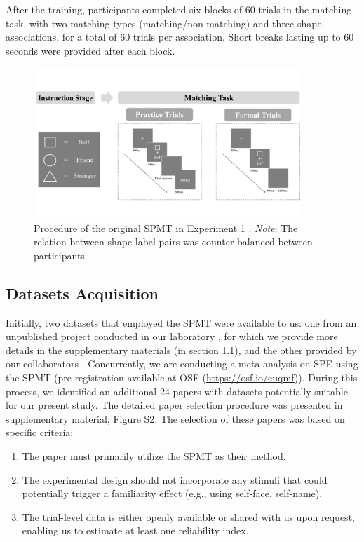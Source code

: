 \documentclass[sn-apa]{sn-jnl}%
\theoremstyle{thmstyleone}%
\theoremstyle{thmstyletwo}%
\theoremstyle{thmstylethree}%
\begin{document}
 After the training, participants completed six blocks of 60 trials in the matching task, with two matching types (matching/non-matching) and three shape associations, for a total of 60 trials per association. Short breaks lasting up to 60 seconds were provided after each block. 

\begin{figure}[!htbp]
	\centering
	\includegraphics[width=0.9\textwidth]{./Figure/Fig_1_exp_pro.png}
	\caption{Procedure of the original SPMT in Experiment 1 \parencite{sui2012perceptual}. \textit{Note}: The relation between shape-label pairs was counter-balanced between participants.
	}\label{fig:SPMT_procedure}
\end{figure}

\subsection{Datasets Acquisition}\label{subsec:dataset}

Initially, two datasets that employed the SPMT were available to us: one from an unpublished project conducted in our laboratory \parencite{hu2023data}, for which we provide more details in the supplementary materials (in section 1.1), and the other provided by our collaborators \parencite{liu2023to}. Concurrently, we are conducting a meta-analysis on SPE using the SPMT (pre-registration available at OSF (\url{https://osf.io/euqmf})). During this process, we identified an additional 24 papers with datasets potentially suitable for our present study. The detailed paper selection procedure was presented in supplementary material, Figure S2. The selection of these papers was based on specific criteria:

\begin{enumerate}[label=\arabic*)]
	\item The paper must primarily utilize the SPMT as their method.
	\item The experimental design should not incorporate any stimuli that could potentially trigger a familiarity effect (e.g., using self-face, self-name).
	\item The trial-level data is either openly available or shared with us upon request, enabling us to estimate at least one reliability index. 
\end{enumerate}
\end{document}
